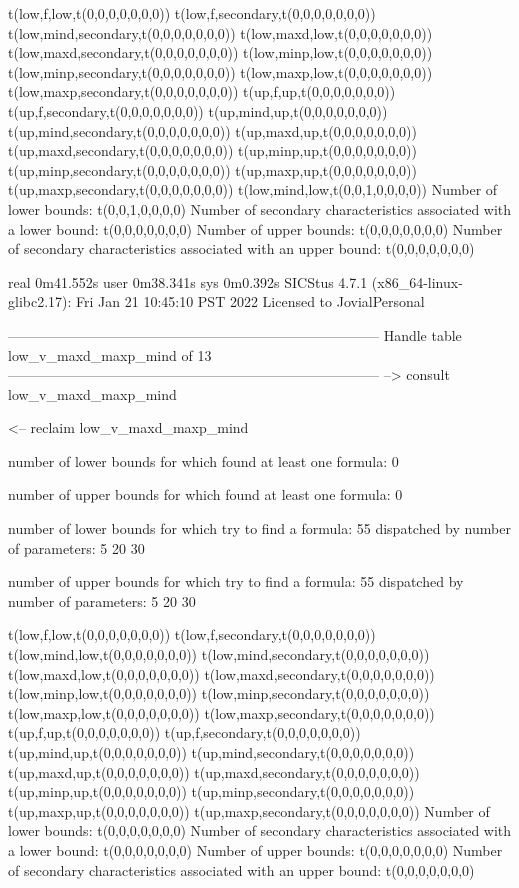 t(low,f,low,t(0,0,0,0,0,0,0))
t(low,f,secondary,t(0,0,0,0,0,0,0))
t(low,mind,secondary,t(0,0,0,0,0,0,0))
t(low,maxd,low,t(0,0,0,0,0,0,0))
t(low,maxd,secondary,t(0,0,0,0,0,0,0))
t(low,minp,low,t(0,0,0,0,0,0,0))
t(low,minp,secondary,t(0,0,0,0,0,0,0))
t(low,maxp,low,t(0,0,0,0,0,0,0))
t(low,maxp,secondary,t(0,0,0,0,0,0,0))
t(up,f,up,t(0,0,0,0,0,0,0))
t(up,f,secondary,t(0,0,0,0,0,0,0))
t(up,mind,up,t(0,0,0,0,0,0,0))
t(up,mind,secondary,t(0,0,0,0,0,0,0))
t(up,maxd,up,t(0,0,0,0,0,0,0))
t(up,maxd,secondary,t(0,0,0,0,0,0,0))
t(up,minp,up,t(0,0,0,0,0,0,0))
t(up,minp,secondary,t(0,0,0,0,0,0,0))
t(up,maxp,up,t(0,0,0,0,0,0,0))
t(up,maxp,secondary,t(0,0,0,0,0,0,0))
t(low,mind,low,t(0,0,1,0,0,0,0))
Number of lower bounds:                                             t(0,0,1,0,0,0,0)
Number of secondary characteristics associated with a lower bound:  t(0,0,0,0,0,0,0)
Number of upper bounds:                                             t(0,0,0,0,0,0,0)
Number of secondary characteristics associated with an upper bound: t(0,0,0,0,0,0,0)

real	0m41.552s
user	0m38.341s
sys	0m0.392s
SICStus 4.7.1 (x86_64-linux-glibc2.17): Fri Jan 21 10:45:10 PST 2022
Licensed to JovialPersonal


--------------------------------------------------------------------------------
Handle table low_v_maxd_maxp_mind of 13
--------------------------------------------------------------------------------
--> consult low_v_maxd_maxp_mind

<-- reclaim low_v_maxd_maxp_mind

number of lower bounds for which found at least one formula: 0

number of upper bounds for which found at least one formula: 0

number of lower bounds for which try to find a formula: 55
dispatched by number of parameters: 5  20  30

number of upper bounds for which try to find a formula: 55
dispatched by number of parameters: 5  20  30

t(low,f,low,t(0,0,0,0,0,0,0))
t(low,f,secondary,t(0,0,0,0,0,0,0))
t(low,mind,low,t(0,0,0,0,0,0,0))
t(low,mind,secondary,t(0,0,0,0,0,0,0))
t(low,maxd,low,t(0,0,0,0,0,0,0))
t(low,maxd,secondary,t(0,0,0,0,0,0,0))
t(low,minp,low,t(0,0,0,0,0,0,0))
t(low,minp,secondary,t(0,0,0,0,0,0,0))
t(low,maxp,low,t(0,0,0,0,0,0,0))
t(low,maxp,secondary,t(0,0,0,0,0,0,0))
t(up,f,up,t(0,0,0,0,0,0,0))
t(up,f,secondary,t(0,0,0,0,0,0,0))
t(up,mind,up,t(0,0,0,0,0,0,0))
t(up,mind,secondary,t(0,0,0,0,0,0,0))
t(up,maxd,up,t(0,0,0,0,0,0,0))
t(up,maxd,secondary,t(0,0,0,0,0,0,0))
t(up,minp,up,t(0,0,0,0,0,0,0))
t(up,minp,secondary,t(0,0,0,0,0,0,0))
t(up,maxp,up,t(0,0,0,0,0,0,0))
t(up,maxp,secondary,t(0,0,0,0,0,0,0))
Number of lower bounds:                                             t(0,0,0,0,0,0,0)
Number of secondary characteristics associated with a lower bound:  t(0,0,0,0,0,0,0)
Number of upper bounds:                                             t(0,0,0,0,0,0,0)
Number of secondary characteristics associated with an upper bound: t(0,0,0,0,0,0,0)

